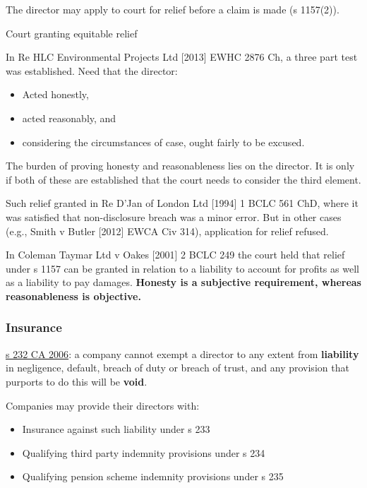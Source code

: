 \documentclass[
]{article}
\providecommand{\tightlist}{%
  \setlength{\itemsep}{0pt}\setlength{\parskip}{0pt}}
\newenvironment{env-d7dfd3c8-6d94-4eed-a91e-ca5b45830c05}
{
    \savenotes\tcolorbox[blanker,breakable,left=5pt,borderline west={2pt}{-4pt}{pink}]
}
{
    \endtcolorbox\spewnotes
}
\begin{document}
The director may apply to court for relief before a claim is made (s
1157(2)).

\begin{env-d7dfd3c8-6d94-4eed-a91e-ca5b45830c05}

Court granting equitable relief

In Re HLC Environmental Projects Ltd {[}2013{]} EWHC 2876 Ch, a three
part test was established. Need that the director:

\begin{itemize}
\tightlist
\item
  Acted honestly,
\item
  acted reasonably, and
\item
  considering the circumstances of case, ought fairly to be excused.
\end{itemize}

\end{env-d7dfd3c8-6d94-4eed-a91e-ca5b45830c05}

The burden of proving honesty and reasonableness lies on the director.
It is only if both of these are established that the court needs to
consider the third element.

Such relief granted in Re D'Jan of London Ltd {[}1994{]} 1 BCLC 561 ChD,
where it was satisfied that non-disclosure breach was a minor error. But
in other cases (e.g., Smith v Butler {[}2012{]} EWCA Civ 314),
application for relief refused.

In Coleman Taymar Ltd v Oakes {[}2001{]} 2 BCLC 249 the court held that
relief under s 1157 can be granted in relation to a liability to account
for profits as well as a liability to pay damages. \textbf{Honesty is a
subjective requirement, whereas reasonableness is objective.}

\hypertarget{insurance}{%
\subsubsection{Insurance}\label{insurance}}

\href{https://www.legislation.gov.uk/ukpga/2006/46/section/232}{s 232 CA
2006}: a company cannot exempt a director to any extent from
\textbf{liability} in negligence, default, breach of duty or breach of
trust, and any provision that purports to do this will be \textbf{void}.

Companies may provide their directors with:

\begin{itemize}
\tightlist
\item
  Insurance against such liability under s 233
\item
  Qualifying third party indemnity provisions under s 234
\item
  Qualifying pension scheme indemnity provisions under s 235
\end{itemize}
\end{document}
